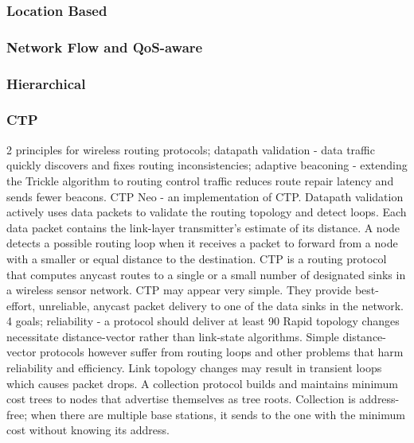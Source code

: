 \subsubsection{Location Based}

\subsubsection{Network Flow and QoS-aware}

\subsubsection{Hierarchical}
\subsubsection*{CTP}
2 principles for wireless routing protocols; datapath validation - data traffic quickly discovers and fixes routing inconsistencies; adaptive beaconing - extending the Trickle algorithm to routing control traffic reduces route repair latency and sends fewer beacons. CTP Neo - an implementation of CTP.
Datapath validation actively uses data packets to validate the routing topology and detect loops. Each data packet contains the link-layer transmitter’s estimate of its distance. A node detects a possible routing loop when it receives a packet to forward from a node with a smaller or equal distance to the destination.
CTP is a routing protocol that computes anycast routes to a single or a small number of designated sinks in a wireless sensor network. CTP may appear very simple. They provide best-effort, unreliable, anycast packet delivery to one of the data sinks in the network. 
4 goals; reliability - a protocol should deliver at least 90%
Rapid topology changes necessitate distance-vector rather than link-state algorithms. Simple distance-vector protocols however suffer from routing loops and other problems that harm reliability and efficiency. Link topology changes may result in transient loops which causes packet drops. A collection protocol builds and maintains minimum cost trees to nodes that advertise themselves as tree roots. Collection is address-free; when there are multiple base stations, it sends to the one with the minimum cost without knowing its address.

